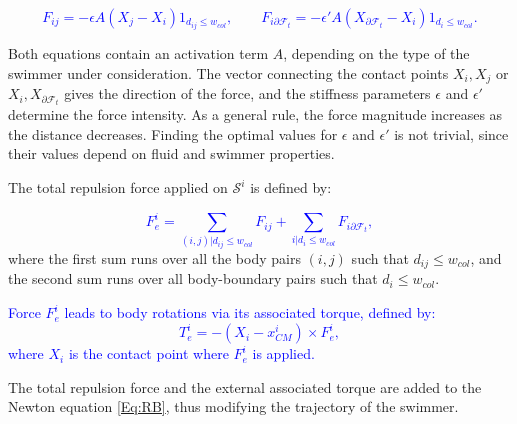 \documentclass[graybox]{svmult}
\newcommand{\review}[1]{\textcolor{blue}{#1}}
\newcommand{\Fluid}{\mathcal{F}} %
\newcommand{\Solid}{\mathcal{S}} %
\begin{document}

\review{
$$
F_{ij} = - \epsilon A  ( X_j - X_i)  1_{d_{ij} \leq w_{col}}, \qquad
F_{i \partial \Fluid_t} = - \epsilon' A ( X_{\partial \Fluid_t} - X_i )  1_{d_{i} \leq w_{col}}.
$$}

Both equations contain an activation term $A$, depending on the type of the swimmer under consideration.  The vector connecting the contact points $X_i, X_j$ or $X_i, X_{\partial \Fluid_t}$
gives the direction of the force, and the stiffness parameters $\epsilon$ and $\epsilon'$ determine the force intensity. As a general rule, the force magnitude increases as the distance decreases. Finding the optimal values for $\epsilon$ and $\epsilon'$ is not trivial, since their values depend on fluid and swimmer properties.   

The total repulsion force applied on $\Solid^i$ is defined by:


\review{
$$
F_e^i = \sum_{(i,j)|d_{ij} \leq w_{col}} F_{ij} +  \sum_{i | d_i \leq w_{col}} F_{i \partial \Fluid_t},
$$
}
where the first sum runs over all the body pairs $(i,j)$ such that $d_{ij}\le w_{col}$, and the second sum runs over all body-boundary pairs such that $d_{i}\le w_{col}$.

\review{ Force $F_e^i$ leads to body rotations via its associated torque, defined by: 
$$
T_e^i = - (X_i - x_{CM}^i )\times F_e^i,
$$
where  $X_i$ is the contact point where $F_e^i$ is applied.}

The total repulsion force and the external associated torque are added to the Newton equation \eqref{Eq:RB}, thus modifying the trajectory of the swimmer.  

\end{document}
